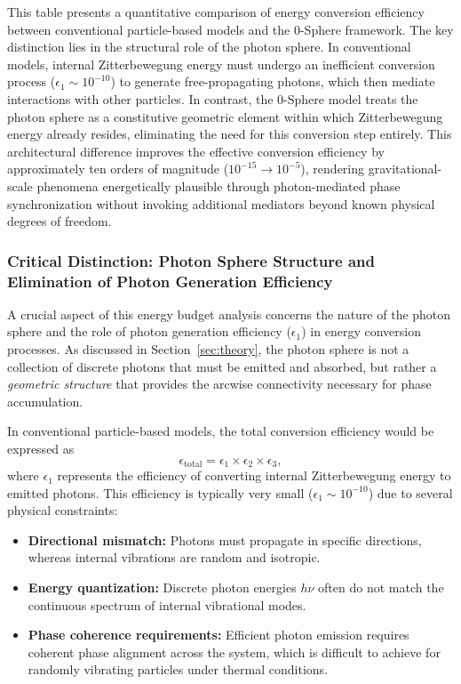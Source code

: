 \documentclass[%
 reprint,
 amsmath,amssymb,
 aps,
 prb,
]{revtex4-2}
\numberwithin{equation}{section}
\begin{document}
\begin{table}[th!]
\begin{minipage}{0.95\textwidth}
\justifying\small
This table presents a quantitative comparison of energy conversion efficiency between conventional particle-based models and the 0-Sphere framework. The key distinction lies in the structural role of the photon sphere. In conventional models, internal Zitterbewegung energy must undergo an inefficient conversion process ($\epsilon_1 \sim 10^{-10}$) to generate free-propagating photons, which then mediate interactions with other particles. In contrast, the 0-Sphere model treats the photon sphere as a constitutive geometric element within which Zitterbewegung energy already resides, eliminating the need for this conversion step entirely. This architectural difference improves the effective conversion efficiency by approximately ten orders of magnitude ($10^{-15} \rightarrow 10^{-5}$), rendering gravitational-scale phenomena energetically plausible through photon-mediated phase synchronization without invoking additional mediators beyond known physical degrees of freedom.
\end{minipage}
\end{table}

\subsubsection{Critical Distinction: Photon Sphere Structure and Elimination of Photon Generation Efficiency}

A crucial aspect of this energy budget analysis concerns the nature of the photon sphere and the role of photon generation efficiency ($\epsilon_1$) in energy conversion processes. As discussed in Section~\ref{sec:theory}, the photon sphere is not a collection of discrete photons that must be emitted and absorbed, but rather a \textit{geometric structure} that provides the arcwise connectivity necessary for phase accumulation.

In conventional particle-based models, the total conversion efficiency would be expressed as
\begin{equation}
\epsilon_{\text{total}} = \epsilon_1 \times \epsilon_2 \times \epsilon_3,
\end{equation}
where $\epsilon_1$ represents the efficiency of converting internal Zitterbewegung energy to emitted photons. This efficiency is typically very small ($\epsilon_1 \sim 10^{-10}$) due to several physical constraints:

\begin{itemize}
\item \textbf{Directional mismatch:} Photons must propagate in specific directions, whereas internal vibrations are random and isotropic.
\item \textbf{Energy quantization:} Discrete photon energies $h\nu$ often do not match the continuous spectrum of internal vibrational modes.
\item \textbf{Phase coherence requirements:} Efficient photon emission requires coherent phase alignment across the system, which is difficult to achieve for randomly vibrating particles under thermal conditions.
\end{itemize}
\end{document}
